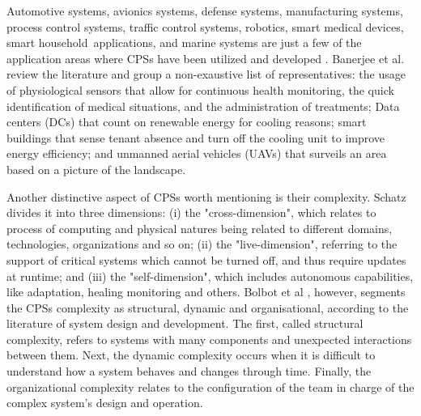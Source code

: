 Automotive systems, avionics systems, defense systems, manufacturing systems, process control systems, traffic control systems, robotics, smart medical devices, smart household applications, and marine systems are just a few of the application areas where CPSs have been utilized and developed \cite{bolbot2019vulnerabilities}. Banerjee et al. \cite{banerjee2011ensuring} review the literature and group a non-exaustive list of representatives: the usage of physiological sensors that allow for continuous health monitoring, the quick identification of medical situations, and the administration of treatments; Data centers (DCs) that count on renewable energy for cooling reasons; smart buildings that sense tenant absence and turn off the cooling unit to improve energy efficiency; and unmanned aerial vehicles (UAVs) that surveils an area based on a picture of the landscape.

Another distinctive aspect of CPSs worth mentioning is their complexity. Schatz \cite{schatz2014role} divides it into three dimensions: (i) the "cross-dimension", which relates to process of computing and physical natures being related to different domains, technologies, organizations and so on; (ii) the "live-dimension", referring to the support of critical systems which cannot be turned off, and thus require updates at runtime; and (iii) the "self-dimension", which includes autonomous capabilities, like adaptation, healing monitoring and others. Bolbot et al \cite{bolbot2019vulnerabilities}, however, segments the CPSs complexity as structural, dynamic and organisational, according to the literature of system design and development. The first, called structural complexity, refers to systems with many components and unexpected interactions between them. Next, the dynamic complexity occurs when it is difficult to understand how a system behaves and changes through time. Finally, the organizational complexity relates to the configuration of the team in charge of the complex system's design and operation.

